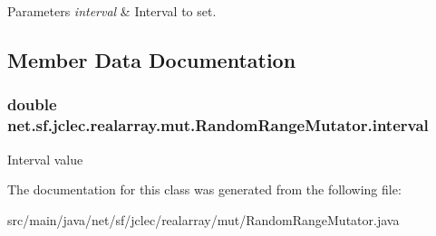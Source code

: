 \begin{DoxyParams}{Parameters}
{\em interval} & Interval to set. \\
\hline
\end{DoxyParams}


\subsection{Member Data Documentation}
\hypertarget{classnet_1_1sf_1_1jclec_1_1realarray_1_1mut_1_1_random_range_mutator_a2c3337c4ddd2f12713c13de5486b7c5c}{
\subsubsection[{interval}]{\setlength{\rightskip}{0pt plus 5cm}double net.\-sf.\-jclec.\-realarray.\-mut.\-Random\-Range\-Mutator.\-interval\hspace{0.3cm}{\ttfamily [protected]}}}\label{classnet_1_1sf_1_1jclec_1_1realarray_1_1mut_1_1_random_range_mutator_a2c3337c4ddd2f12713c13de5486b7c5c}
Interval value 

The documentation for this class was generated from the following file\-:\begin{DoxyCompactItemize}
\item 
src/main/java/net/sf/jclec/realarray/mut/Random\-Range\-Mutator.\-java\end{DoxyCompactItemize}
